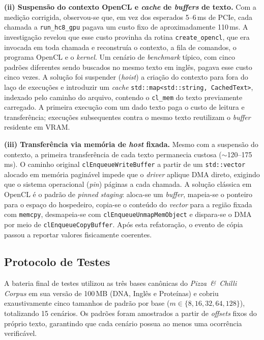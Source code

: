 \documentclass[12pt]{article}
\begin{document}
\textbf{(ii) Suspensão do contexto OpenCL e \textit{cache} de \textit{buffers} de texto.} Com a medição corrigida, observou-se que, em vez dos esperados 5--6\,ms de PCIe, cada chamada a \texttt{run\_hc8\_gpu} pagava um custo fixo de aproximadamente 110\,ms. A investigação revelou que esse custo provinha da rotina \texttt{create\_opencl}, que era invocada em toda chamada e reconstruía o contexto, a fila de comandos, o programa OpenCL e o \textit{kernel}. Um cenário de \textit{benchmark} típico, com cinco padrões diferentes sendo buscados no mesmo texto em inglês, pagava esse custo cinco vezes. A solução foi suspender (\textit{hoist}) a criação do contexto para fora do laço de execuções e introduzir um \textit{cache} \texttt{std::map<std::string, CachedText>}, indexado pelo caminho do arquivo, contendo o \texttt{cl\_mem} do texto previamente carregado. A primeira execução com um dado texto paga o custo de leitura e transferência; execuções subsequentes contra o mesmo texto reutilizam o \textit{buffer} residente em VRAM.

\textbf{(iii) Transferência via memória de \textit{host} fixada.} Mesmo com a suspensão do contexto, a primeira transferência de cada texto permanecia custosa ($\sim$120--175\,ms). O caminho original  \texttt{clEnqueueWriteBuffer} a partir de um \texttt{std::vector} alocado em memória paginável  impede que o \textit{driver} aplique DMA direto, exigindo que o sistema operacional (\textit{pin}) páginas a cada chamada. A solução clássica em OpenCL é o padrão de \textit{pinned staging}: aloca-se um \textit{buffer}, mapeia-se o ponteiro para o espaço do hospedeiro, copia-se o conteúdo do \textit{vector} para a região fixada com \texttt{memcpy}, desmapeia-se com \texttt{clEnqueueUnmapMemObject} e dispara-se o DMA por meio de \texttt{clEnqueueCopyBuffer}. Após esta refatoração, o evento de cópia passou a reportar valores fisicamente coerentes.


\subsection{Protocolo de Testes}
\label{sec:protocolo}

A bateria final de testes utilizou as três bases canônicas do \textit{Pizza~\&~Chilli Corpus} em sua versão de 100\,MB (DNA, Inglês e Proteínas) e cobriu exaustivamente cinco tamanhos de padrão por base ($m \in \{8, 16, 32, 64, 128\}$), totalizando 15 cenários. Os padrões foram amostrados a partir de \textit{offsets} fixos do próprio texto, garantindo que cada cenário possua ao menos uma ocorrência verificável.
\end{document}
